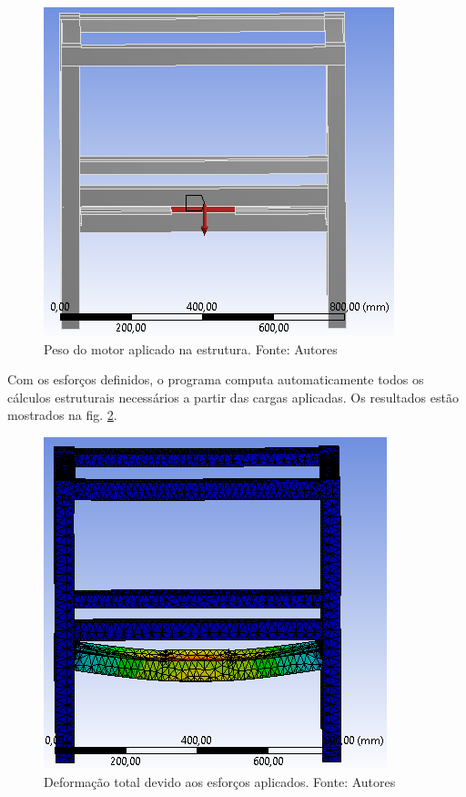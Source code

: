   \begin{figure}[H]
      \centering
      \includegraphics[scale=0.7]{figuras/carga_motor.png}
      \caption{Peso do motor aplicado na estrutura. Fonte: Autores}
      \label{fig:carga_motor}
      \end{figure}

      Com os esforços definidos, o programa computa automaticamente todos os cálculos estruturais necessários a partir das cargas aplicadas. Os resultados estão mostrados na fig. \ref{fig:def_motor}.

  \begin{figure}[H]
      \centering
      \includegraphics[scale=0.7]{figuras/def_motor.png}
      \caption{Deformação total devido aos esforços aplicados. Fonte: Autores}
      \label{fig:def_motor}
      \end{figure}

